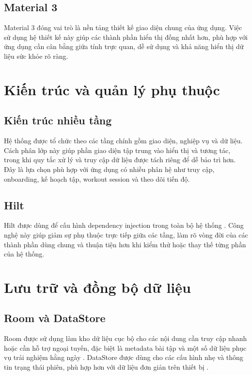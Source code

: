 \subsection{Material 3}

Material 3 đóng vai trò là nền tảng thiết kế giao diện chung của ứng dụng. Việc sử dụng hệ thiết kế này giúp các thành phần hiển thị đồng nhất hơn, phù hợp với ứng dụng cần cân bằng giữa tính trực quan, dễ sử dụng và khả năng hiển thị dữ liệu sức khỏe rõ ràng.

\section{Kiến trúc và quản lý phụ thuộc}

\subsection{Kiến trúc nhiều tầng}

Hệ thống được tổ chức theo các tầng chính gồm giao diện, nghiệp vụ và dữ liệu. Cách phân lớp này giúp phần giao diện tập trung vào hiển thị và tương tác, trong khi quy tắc xử lý và truy cập dữ liệu được tách riêng để dễ bảo trì hơn. Đây là lựa chọn phù hợp với ứng dụng có nhiều phân hệ như truy cập, onboarding, kế hoạch tập, workout session và theo dõi tiến độ.

\subsection{Hilt}

Hilt được dùng để cấu hình dependency injection trong toàn bộ hệ thống \cite{android_hilt}. Công nghệ này giúp giảm sự phụ thuộc trực tiếp giữa các tầng, làm rõ vòng đời của các thành phần dùng chung và thuận tiện hơn khi kiểm thử hoặc thay thế từng phần của hệ thống.

\section{Lưu trữ và đồng bộ dữ liệu}

\subsection{Room và DataStore}

Room được sử dụng làm kho dữ liệu cục bộ cho các nội dung cần truy cập nhanh hoặc cần hỗ trợ ngoại tuyến, đặc biệt là metadata bài tập và một số dữ liệu phục vụ trải nghiệm hằng ngày \cite{android_room}. DataStore được dùng cho các cấu hình nhẹ và thông tin trạng thái phiên, phù hợp hơn với dữ liệu đơn giản trên thiết bị \cite{android_datastore}.

